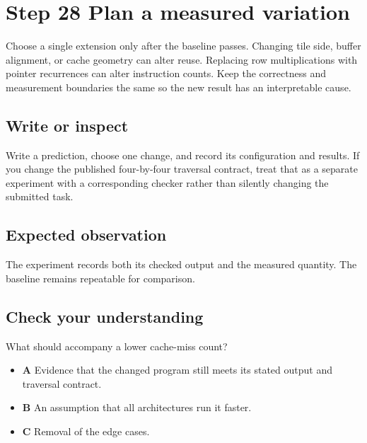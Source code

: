 \section{Step 28 Plan a measured variation}\label{transpose-s28}

Choose a single extension only after the baseline passes. Changing tile side, buffer alignment, or cache geometry can alter reuse. Replacing row multiplications with pointer recurrences can alter instruction counts. Keep the correctness and measurement boundaries the same so the new result has an interpretable cause.

\subsection{Write or inspect}
Write a prediction, choose one change, and record its configuration and results. If you change the published four-by-four traversal contract, treat that as a separate experiment with a corresponding checker rather than silently changing the submitted task.

\subsection{Expected observation}
The experiment records both its checked output and the measured quantity. The baseline remains repeatable for comparison.

\subsection{Check your understanding}
What should accompany a lower cache-miss count?

\begin{itemize}
  \item \textbf{A} Evidence that the changed program still meets its stated output and traversal contract.
  \item \textbf{B} An assumption that all architectures run it faster.
  \item \textbf{C} Removal of the edge cases.
\end{itemize}
